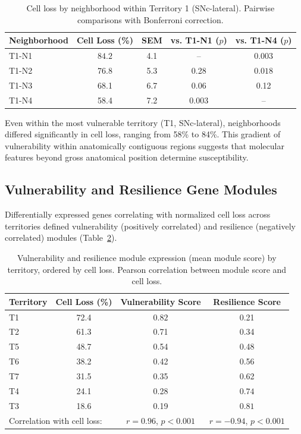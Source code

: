 \documentclass[11pt]{article}
\begin{document}
\begin{table}[H]
\centering
\caption{Cell loss by neighborhood within Territory 1 (SNc-lateral). Pairwise comparisons with Bonferroni correction.}
\label{tab:neighborhoods}
\begin{tabular}{lcccc}
\toprule
Neighborhood & Cell Loss (\%) & SEM & vs. T1-N1 ($p$) & vs. T1-N4 ($p$) \\
\midrule
T1-N1 & $\mathbf{84.2}$ & 4.1 & -- & $\mathbf{0.003}$ \\
T1-N2 & 76.8 & 5.3 & 0.28 & $\mathbf{0.018}$ \\
T1-N3 & 68.1 & 6.7 & 0.06 & 0.12 \\
T1-N4 & 58.4 & 7.2 & $\mathbf{0.003}$ & -- \\
\bottomrule
\end{tabular}
\end{table}

Even within the most vulnerable territory (T1, SNc-lateral), neighborhoods differed significantly in cell loss, ranging from 58\% to 84\%. This gradient of vulnerability within anatomically contiguous regions suggests that molecular features beyond gross anatomical position determine susceptibility.

\subsection{Vulnerability and Resilience Gene Modules}

Differentially expressed genes correlating with normalized cell loss across territories defined vulnerability (positively correlated) and resilience (negatively correlated) modules (Table~\ref{tab:modules}).

\begin{table}[H]
\centering
\caption{Vulnerability and resilience module expression (mean module score) by territory, ordered by cell loss. Pearson correlation between module score and cell loss.}
\label{tab:modules}
\begin{tabular}{lccc}
\toprule
Territory & Cell Loss (\%) & Vulnerability Score & Resilience Score \\
\midrule
T1 & 72.4 & $\mathbf{0.82}$ & 0.21 \\
T2 & 61.3 & 0.71 & 0.34 \\
T5 & 48.7 & 0.54 & 0.48 \\
T6 & 38.2 & 0.42 & 0.56 \\
T7 & 31.5 & 0.35 & 0.62 \\
T4 & 24.1 & 0.28 & $\mathbf{0.74}$ \\
T3 & 18.6 & 0.19 & $\mathbf{0.81}$ \\
\midrule
\multicolumn{2}{l}{Correlation with cell loss:} & $r = 0.96$, $p < 0.001$ & $r = -0.94$, $p < 0.001$ \\
\bottomrule
\end{tabular}
\end{table}
\end{document}
